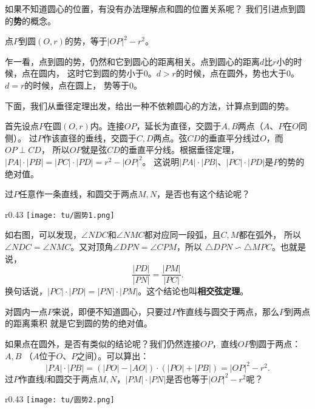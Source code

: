 \documentclass[12pt,UTF8]{ctexbook}
\begin{document}
如果不知道圆心的位置，有没有办法理解点和圆的位置关系呢？
我们引进点到圆的\textbf{势}的概念。

\begin{df}
   点$P$到圆$(O, r)$的势，等于$|OP|^2 - r^2$。 
\end{df}

乍一看，点到圆的势，仍然和它到圆心的距离相关。点到圆心的距离$d$比$r$小的时候，点在圆内，
这时它到圆的势小于$0$。$d>r$的时候，点在圆外，势也大于$0$。$d=r$的时候，点在圆上，
势等于$0$。

下面，我们从垂径定理出发，给出一种不依赖圆心的方法，计算点到圆的势。

首先设点$P$在圆$(O,r)$内。连接$OP$，延长为直径，交圆于$A,B$两点（$A$、$P$在$O$同侧）。
过$P$作该直径的垂线，交圆于$C,D$两点。弦$CD$的垂直平分线过$O$，而$OP \perp CD$，
所以$OP$就是弦$CD$的垂直平分线。根据垂径定理，$|PA|\cdot|PB| = |PC| \cdot |PD| = r^2 - |OP|^2$。
这说明$|PA|\cdot|PB|$、$|PC| \cdot |PD|$是$P$的势的绝对值。

过$P$任意作一条直线，和圆交于两点$M,N$，是否也有这个结论呢？

\begin{wrapfigure}[7]{r}{0.43\textwidth} %
    \vspace{-22pt}
    \flushright
    \texttt{[image: tu/圆势1.png]}
\end{wrapfigure}

如右图，可以发现，$\angle NDC$和$\angle NMC$都对应同一段弧，且$C,M$都在弧外，
所以$\angle NDC = \angle NMC$。又对顶角$\angle DPN = \angle CPM$，所以
$ \triangle DPN \backsim \triangle MPC$。也就是说，
$$ \frac{|PD|}{|PN|} = \frac{|PM|}{|PC|}.$$
换句话说，$|PC| \cdot |PD| = |PN|\cdot|PM|$。这个结论也叫\textbf{相交弦定理}。

对圆内一点$P$来说，即便不知道圆心，只要过$P$作直线与圆交于两点，那么$P$到两点的距离乘积
就是它到圆的势的绝对值。

如果点在圆外，是否有类似的结论呢？我们仍然连接$OP$，直线$OP$割圆于两点：$A,B$
（$A$位于$O$、$P$之间）。可以算出：
$$|PA|\cdot|PB| = (|PO| - |AO|) \cdot (|PO| + |PB|) = |OP|^2 - r^2.$$
过$P$作直线$l$和圆交于两点$M,N$，$|PM| \cdot |PN|$是否也等于$|OP|^2 - r^2$呢？

\begin{wrapfigure}[12]{r}{0.43\textwidth} %
    \vspace{-18pt}
    \flushright
    \texttt{[image: tu/圆势2.png]}
\end{wrapfigure}
\end{document}
